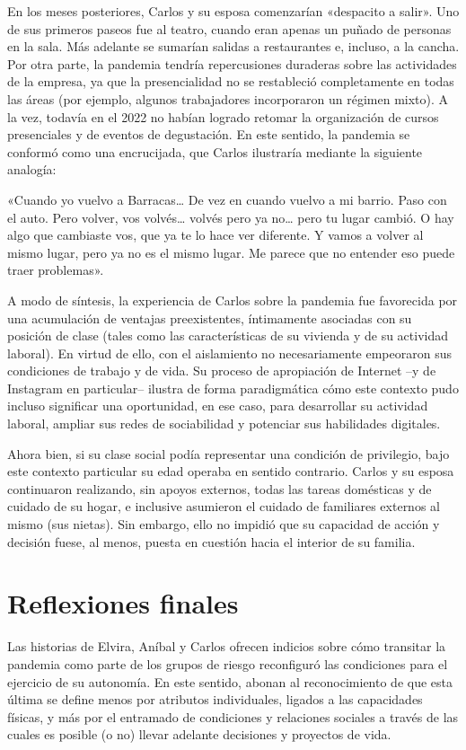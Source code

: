 \begin{refsection}
\begin{gbcita}
\end{gbcita}

En los meses posteriores, Carlos y su esposa comenzarían «despacito a salir». Uno de sus primeros paseos fue al teatro, cuando eran apenas un puñado de personas en la sala. Más adelante se sumarían salidas a restaurantes e, incluso, a la cancha. Por otra parte, la pandemia tendría repercusiones duraderas sobre las actividades de la empresa, ya que la presencialidad no se restableció completamente en todas las áreas (por ejemplo, algunos trabajadores incorporaron un régimen mixto). A la vez, todavía en el 2022 no habían logrado retomar la organización de cursos presenciales y de eventos de degustación. En este sentido, la pandemia se conformó como una encrucijada, que Carlos ilustraría mediante la siguiente analogía:


\begin{gbcita}
«Cuando yo vuelvo a Barracas… De vez en cuando vuelvo a mi barrio. Paso con el auto. Pero volver, vos volvés… volvés pero ya no… pero tu lugar cambió. O hay algo que cambiaste vos, que ya te lo hace ver diferente. Y vamos a volver al mismo lugar, pero ya no es el mismo lugar. Me parece que no entender eso puede traer problemas».

\end{gbcita}

A modo de síntesis, la experiencia de Carlos sobre la pandemia fue favorecida por una acumulación de ventajas preexistentes, íntimamente asociadas con su posición de clase (tales como las características de su vivienda y de su actividad laboral). En virtud de ello, con el aislamiento no necesariamente empeoraron sus condiciones de trabajo y de vida. Su proceso de apropiación de Internet –y de Instagram en particular– ilustra de forma paradigmática cómo este contexto pudo incluso significar una oportunidad, en ese caso, para desarrollar su actividad laboral, ampliar sus redes de sociabilidad y potenciar sus habilidades digitales.

Ahora bien, si su clase social podía representar una condición de privilegio, bajo este contexto particular su edad operaba en sentido contrario. Carlos y su esposa continuaron realizando, sin apoyos externos, todas las tareas domésticas y de cuidado de su hogar, e inclusive asumieron el cuidado de familiares externos al mismo (sus nietas). Sin embargo, ello no impidió que su capacidad de acción y decisión fuese, al menos, puesta en cuestión hacia el interior de su familia.


\section[Reflexiones finales]{Reflexiones finales}
\label{cap-30.reflexiones-finales}
Las historias de Elvira, Aníbal y Carlos ofrecen indicios sobre cómo transitar la pandemia como parte de los grupos de riesgo reconfiguró las condiciones para el ejercicio de su autonomía. En este sentido, abonan al reconocimiento de que esta última se define menos por atributos individuales, ligados a las capacidades físicas, y más por el entramado de condiciones y relaciones sociales a través de las cuales es posible (o no) llevar adelante decisiones y proyectos de vida.


\end{refsection}
